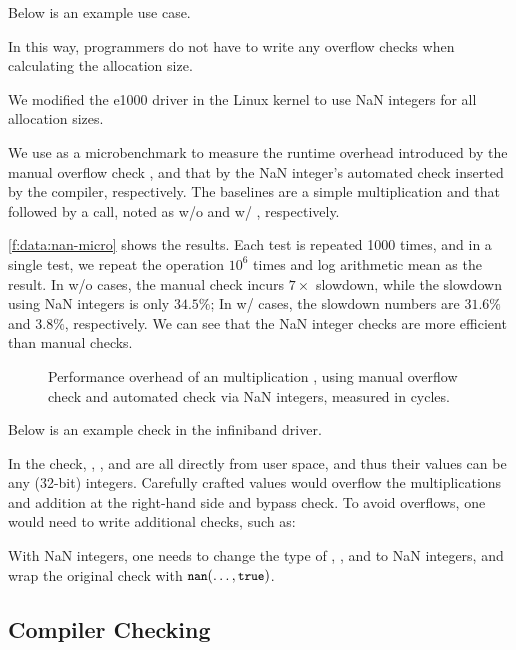 Below is an example use case.

In this way, programmers do not have to write any overflow checks
when calculating the allocation size.

We modified the e1000 driver in the Linux kernel to use NaN integers
for all allocation sizes.

We use  as a microbenchmark to measure the runtime
overhead introduced by the manual overflow check , and that by the NaN integer's automated check
inserted by the compiler, respectively.
%
The baselines are a simple multiplication and that followed by a
 call, noted as w/o and w/ , respectively.

\autoref{f:data:nan-micro} shows the results. Each test is repeated 1000 times,
and in a single test, we repeat the operation $10^6$ times and log arithmetic mean
as the result.
%
In w/o  cases, the manual check incurs $7\times$ slowdown, while
the slowdown using NaN integers is only $34.5\%$;
%
In w/  cases, the slowdown numbers are $31.6\%$ and $3.8\%$,
respectively.
%
We can see that the NaN integer checks are more efficient than
manual checks.

\begin{figure}
\centering

\caption{Performance overhead of an multiplication , using
manual overflow check  and automated
check via NaN integers, measured in cycles.}
\label{f:data:nan-micro}
\end{figure}

Below is an example check in the infiniband driver.

In the check, , , and  are
all directly from user space, and thus their values can be any
(32-bit) integers.  Carefully crafted values would overflow the
multiplications and addition at the right-hand side and bypass
check.  To avoid overflows, one would need to write additional
checks, such as:

With NaN integers, one needs to change the type of
, , and  to NaN integers,
and wrap the original check with $\cc{nan}(\dots, \cc{true})$.

\fi


\subsection{Compiler Checking}

